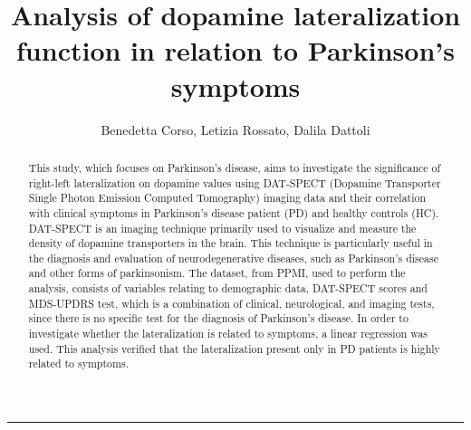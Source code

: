 \documentclass[]{article}
\title{ \textbf{Analysis of dopamine lateralization function in relation to Parkinson's symptoms}}
\author{Benedetta Corso, Letizia Rossato, Dalila Dattoli}
\date{}
\begin{document}
\maketitle

\begin{abstract}
This study, which focuses on Parkinson's disease, aims to investigate the significance of right-left lateralization on dopamine values using DAT-SPECT (Dopamine Transporter Single Photon Emission Computed Tomography) imaging data and their correlation with clinical symptoms in Parkinson’s disease patient (PD) and healthy controls (HC). DAT-SPECT is an imaging technique primarily used to visualize and measure the density of dopamine transporters in the brain. This technique is particularly useful in the diagnosis and evaluation of neurodegenerative diseases, such as Parkinson's disease and other forms of parkinsonism. The dataset, from PPMI, used to perform the analysis, consists of variables relating to demographic data, DAT-SPECT scores and MDS-UPDRS test, which is a combination of clinical, neurological, and imaging tests, since there is no specific test for the diagnosis of Parkinson’s disease. In order to investigate whether the lateralization is related to symptoms, a linear regression was used. This analysis verified that the lateralization present only in PD patients is highly related to symptoms.
\newline

\end{abstract}
\vspace{5pt}
\hrule
\vspace{6pt}
\end{document}
